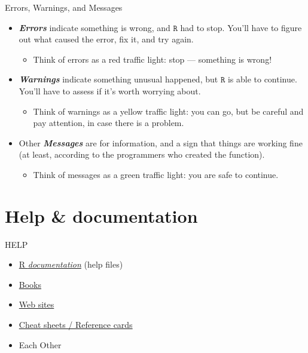 \documentclass[
  11pt,
  ignorenonframetext,
]{beamer}
\providecommand{\tightlist}{%
  \setlength{\itemsep}{0pt}\setlength{\parskip}{0pt}}
\begin{document}
\begin{frame}{Errors, Warnings, and Messages}
\protect\hypertarget{errors-warnings-and-messages-1}{}
\begin{itemize}
\item
  \textbf{\emph{Errors}} indicate something is wrong, and \(\texttt{R}\)
  had to stop. You'll have to figure out what caused the error, fix it,
  and try again.

  \begin{itemize}
  \tightlist
  \item
    \textcolor[rgb]{0.8,0,0}{Think of errors as a red traffic light: stop --- something is wrong!
    }
  \end{itemize}
\item
  \textbf{\emph{Warnings}} indicate something unusual happened, but
  \(\texttt{R}\) is able to continue. You'll have to assess if it's
  worth worrying about.

  \begin{itemize}
  \tightlist
  \item
    \textcolor[rgb]{0.9,0.7,0}{Think of warnings as a yellow traffic light: you can go, but be careful and pay attention, in case there is a problem.
    }
  \end{itemize}
\item
  Other \textbf{\emph{Messages}} are for information, and a sign that
  things are working fine (at least, according to the programmers who
  created the function).

  \begin{itemize}
  \tightlist
  \item
    \textcolor[rgb]{0,0.6,0}{Think of messages as a green traffic light: you are safe to continue.}
  \end{itemize}
\end{itemize}

\end{frame}

\hypertarget{help-documentation}{%
\section{Help \& documentation}\label{help-documentation}}

\begin{frame}{HELP}
\protect\hypertarget{help}{}
\begin{itemize}
\item
  \protect\hyperlink{textttr-documentation}{R \emph{documentation}}
  (help files)
\item
  \protect\hyperlink{help-books}{Books}
\item
  \protect\hyperlink{help-web-sites}{Web sites}
\item
  \protect\hyperlink{help-reference-cards-cheat-sheets}{Cheat sheets /
  Reference cards}
\item
  Each Other
\end{itemize}
\end{frame}
\end{document}
